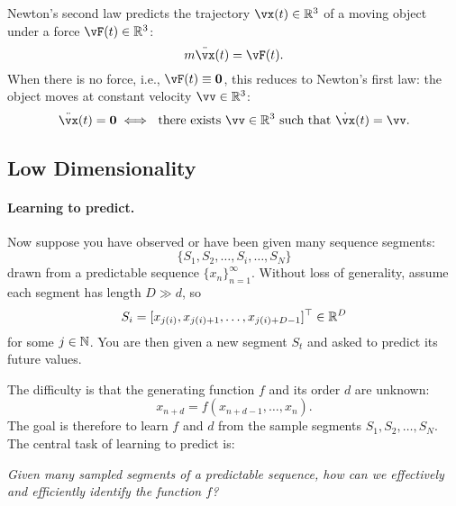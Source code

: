 \documentclass[../../book-main.tex]{subfiles}
\begin{document}
\begin{example}
Newton's second law predicts the trajectory \(\vx(t) \in \R^{3}\) of a moving object under a force \(\vF(t) \in \R^{3}\):
\begin{equation}
    m\ddot{\vx}(t) = \vF(t).
    \label{eqn:newton-second}
\end{equation}
When there is no force, i.e., \(\vF(t) \equiv \vzero\), this reduces to Newton's first law: the object moves at constant velocity \(\vv \in \R^{3}\):
\begin{equation}
    \ddot{\vx}(t) = \vzero \iff \ \text{there exists } \vv \in \R^{3} \text{ such that } \dot{\vx}(t) = \vv.
    \label{eqn:newton-first}
\end{equation}
\end{example}


\subsection{Low Dimensionality}\label{sec:intro-low-dimensionality}
\paragraph{Learning to predict.}
Now suppose you have observed or have been given many sequence segments:
\begin{equation}
    \{S_{1}, S_{2}, \ldots, S_{i}, \ldots, S_{N}\}
\end{equation}
drawn from a predictable sequence \(\{x_{n}\}_{n=1}^{\infty}\). Without loss of generality, assume each segment has length \(D \gg d\), so
\begin{equation}
    S_{i} = [x_{j(i)}, x_{j(i)+1}, \ldots, x_{j(i)+D-1}]^{\top} \in \mathbb{R}^{D}
\end{equation}
for some \(j \in \mathbb{N}\). You are then given a new segment \(S_{t}\) and asked to predict its future values.

The difficulty is that the generating function \(f\) and its order \(d\) are unknown:
\begin{equation}
    x_{n+d} = f(x_{n+d-1}, \ldots, x_{n}).
    \label{eqn:sequence-order-d}
\end{equation}
The goal is therefore to learn \(f\) and \(d\) from the sample segments \(S_{1}, S_{2}, \ldots, S_{N}\). The central task of learning to predict is:
\begin{center}
\textit{Given many sampled segments of a predictable sequence, how can we effectively and efficiently identify the function \(f\)?}
\end{center}
\end{document}

